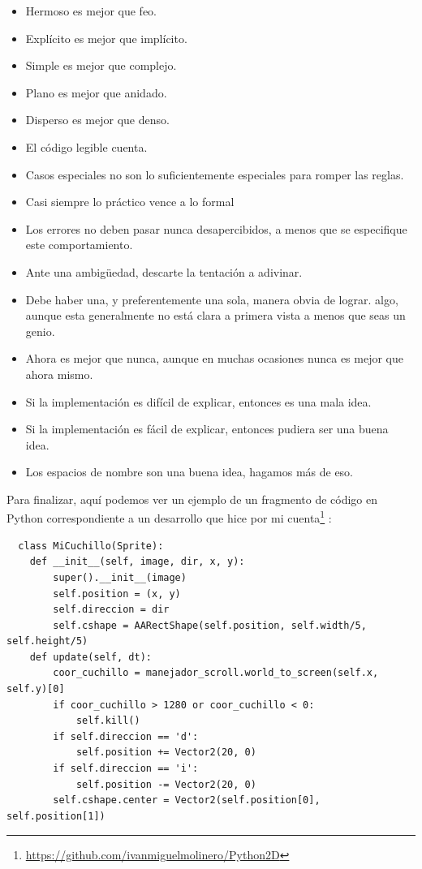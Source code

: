 \documentclass[a4paper, 12pt]{book}
\begin{document}
 \begin{itemize}
 	\item Hermoso es mejor que feo.
	\item Explícito es mejor que implícito.
 	\item Simple es mejor que complejo.
 	\item Plano es mejor que anidado.
 	\item Disperso es mejor que denso.
 	\item El código legible cuenta.
	\item Casos especiales no son lo suficientemente 	especiales para romper las reglas.
	\item Casi siempre lo práctico vence a lo formal
	\item Los errores no deben pasar nunca desapercibidos, a menos que se
especifique este comportamiento.
	\item Ante una ambigüedad, descarte la tentación a adivinar.
	\item Debe haber una, y preferentemente una sola, manera obvia de lograr.
algo, aunque esta generalmente no está clara a primera vista a menos
que seas un genio.
	\item Ahora es mejor que nunca, aunque en muchas ocasiones nunca es
mejor que ahora mismo.
	\item Si la implementación es difícil de explicar, entonces es una mala idea.
	\item Si la implementación es fácil de explicar, entonces pudiera ser una
buena idea.
	\item Los espacios de nombre son una buena idea, hagamos más de eso.
 \end{itemize}
 
 Para finalizar, aquí podemos ver un ejemplo de un fragmento de código en Python correspondiente a un desarrollo que hice por mi cuenta\footnote{\url{https://github.com/ivanmiguelmolinero/Python2D}} : 
 
 {\footnotesize
\begin{verbatim}
  class MiCuchillo(Sprite):
    def __init__(self, image, dir, x, y):
        super().__init__(image)
        self.position = (x, y)
        self.direccion = dir
        self.cshape = AARectShape(self.position, self.width/5, self.height/5)
    def update(self, dt):
        coor_cuchillo = manejador_scroll.world_to_screen(self.x, self.y)[0]
        if coor_cuchillo > 1280 or coor_cuchillo < 0:
            self.kill()
        if self.direccion == 'd':
            self.position += Vector2(20, 0)
        if self.direccion == 'i':
            self.position -= Vector2(20, 0)
        self.cshape.center = Vector2(self.position[0], self.position[1])
\end{verbatim}
}
\end{document}
